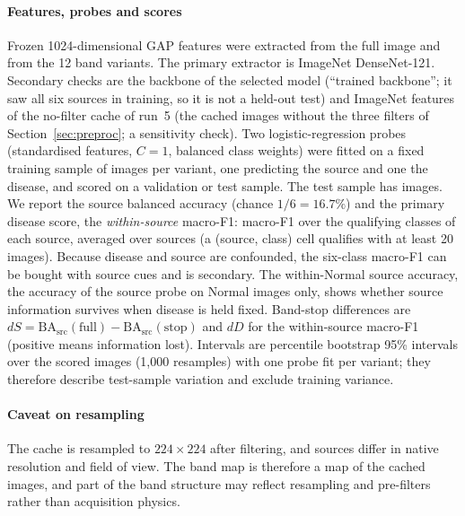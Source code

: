 \paragraph{Features, probes and scores} Frozen 1024-dimensional GAP features were extracted from the full image and from the 12 band variants. The primary extractor is ImageNet DenseNet-121. Secondary checks are the backbone of the selected model (``trained backbone''; it saw all six sources in training, so it is not a held-out test) and ImageNet features of the no-filter cache of run~5 (the cached images without the three filters of Section~\ref{sec:preproc}; a sensitivity check). Two logistic-regression probes (standardised features, $C=1$, balanced class weights) were fitted on a fixed training sample of \RSpecMainTestNTrain{} images per variant, one predicting the source and one the disease, and scored on a validation or test sample. The test sample has \RSpecMainTestN{} images. We report the source balanced accuracy (chance $1/6=16.7\%$) and the primary disease score, the \emph{within-source} macro-F1: macro-F1 over the qualifying classes of each source, averaged over \RSpecMainTestNWithinSources{} sources (a (source, class) cell qualifies with at least 20 images). Because disease and source are confounded, the six-class macro-F1 can be bought with source cues and is secondary. The within-Normal source accuracy, the accuracy of the source probe on Normal images only, shows whether source information survives when disease is held fixed. Band-stop differences are $dS=\text{BA}_{\text{src}}(\text{full})-\text{BA}_{\text{src}}(\text{stop})$ and $dD$ for the within-source macro-F1 (positive means information lost). Intervals are percentile bootstrap 95\% intervals over the scored images (1,000 resamples) with one probe fit per variant; they therefore describe test-sample variation and exclude training variance.

\paragraph{Caveat on resampling} The cache is resampled to $224\times224$ after filtering, and sources differ in native resolution and field of view. The band map is therefore a map of the cached images, and part of the band structure may reflect resampling and pre-filters rather than acquisition physics.

